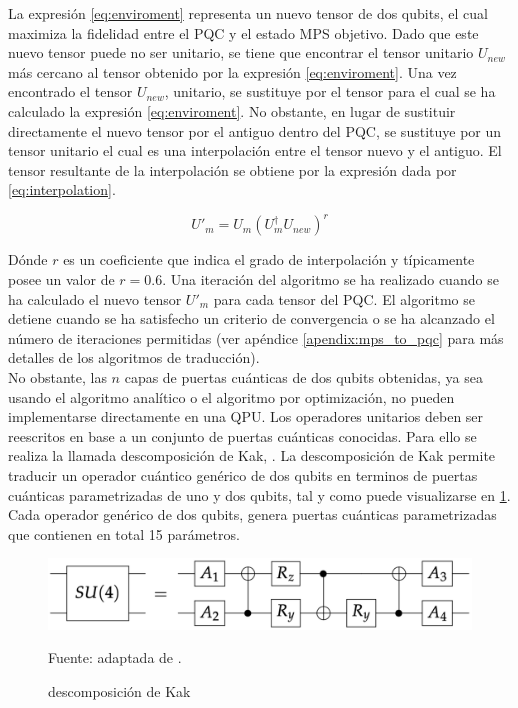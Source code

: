 La expresión \ref{eq:enviroment} representa un nuevo tensor de dos qubits, el cual maximiza la fidelidad entre el \mbox{PQC} y el estado MPS objetivo. Dado que este nuevo tensor puede no ser unitario, se tiene que encontrar el tensor unitario $U_{new}$ más cercano al tensor obtenido por la expresión \ref{eq:enviroment}. Una vez encontrado el tensor $U_{new}$, unitario, se sustituye por el tensor para el cual se ha calculado la expresión \ref{eq:enviroment}. No obstante, en lugar de sustituir directamente el nuevo tensor por el antiguo dentro del \mbox{PQC}, se sustituye por un tensor unitario el cual es una interpolación entre el tensor nuevo y el antiguo. El tensor resultante de la interpolación se obtiene por la expresión dada por \ref{eq:interpolation}.

\begin{equation}
    U'_{m} = U_{m}(U^{\dagger}_{m}U_{new})^{r}
    \label{eq:interpolation}
\end{equation}

Dónde $r$ es un coeficiente que indica el grado de interpolación y típicamente posee un valor de $r=0.6$. Una iteración del algoritmo se ha realizado cuando se ha calculado el nuevo tensor $U'_{m}$ para cada tensor del \mbox{PQC}. El algoritmo se detiene cuando se ha satisfecho un criterio de convergencia o se ha alcanzado el número de iteraciones permitidas (ver apéndice \ref{apendix:mps_to_pqc} para más detalles de los algoritmos de traducción). \\

No obstante, las $n$ capas de puertas cuánticas de dos qubits obtenidas, ya sea usando el algoritmo analítico o el algoritmo por optimización, no pueden implementarse directamente en una QPU. Los operadores unitarios deben ser reescritos en base a un conjunto de puertas cuánticas conocidas. Para ello se realiza la llamada descomposición de Kak, \citep{tucci}. La descomposición de Kak permite traducir un operador cuántico genérico de dos qubits en terminos de puertas cuánticas parametrizadas de uno y dos qubits, tal y como puede visualizarse en \ref{fig:kak_decomposition}. Cada operador genérico de dos qubits, genera puertas cuánticas parametrizadas que contienen en total 15 parámetros. \\


\begin{figure}[!h]
    \centering
    \includegraphics[scale = 0.15]{img/05-kak_decomposition.png}
    \caption{descomposición de Kak}
    Fuente: adaptada de \cite{cenedese}.
    \label{fig:kak_decomposition}
\end{figure}

